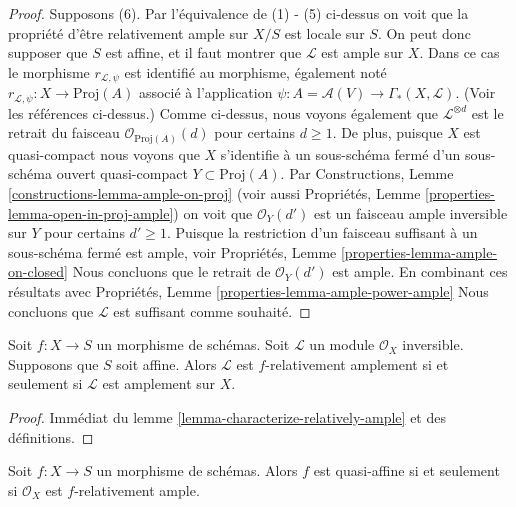 \begin{proof}
\medskip\noindent
Supposons (6). Par l'équivalence de (1) - (5) ci-dessus on
voit que la propriété d'être relativement ample sur $X/S$
est locale sur $S$. On peut donc supposer que
$S$ est affine, et il faut montrer que $\mathcal{L}$
est ample sur $X$. Dans ce cas le morphisme $r_{\mathcal{L}, \psi}$
est identifié au morphisme, également noté $r_{\mathcal{L}, \psi} : X \to \text{Proj}(A)$ associé
à l'application $\psi : A = \mathcal{A}(V) \to \Gamma_*(X, \mathcal{L})$. (Voir les références
ci-dessus.) Comme ci-dessus, nous voyons également
que $\mathcal{L}^{\otimes d}$ est le retrait du faisceau $\mathcal{O}_{\text{Proj}(A)}(d)$
pour certains $d \geq 1$. De plus, puisque
$X$ est quasi-compact nous
voyons que $X$ s'identifie à un sous-schéma fermé
d'un sous-schéma ouvert quasi-compact $Y \subset \text{Proj}(A)$.
Par
Constructions,
Lemme \ref{constructions-lemma-ample-on-proj} (voir aussi Propriétés,
Lemme
\ref{properties-lemma-open-in-proj-ample})
on voit que $\mathcal{O}_Y(d')$ est un faisceau
ample inversible sur $Y$ pour certains $d' \geq 1$.
Puisque la restriction d'un faisceau suffisant à un
sous-schéma fermé est ample, voir Propriétés,
Lemme
\ref{properties-lemma-ample-on-closed} Nous concluons que le
retrait de $\mathcal{O}_Y(d')$ est
ample. En combinant ces résultats avec Propriétés,
Lemme
\ref{properties-lemma-ample-power-ample} Nous concluons que $\mathcal{L}$
est suffisant comme souhaité.
\end{proof}

\begin{lemma}
\label{lemma-ample-over-affine}
\begin{reference}
\cite[II Corollaire 4.6.6]{EGA}
\end{reference}
Soit $f : X \to S$ un morphisme de schémas. Soit $\mathcal{L}$
un module $\mathcal{O}_X$ inversible. Supposons que $S$ soit
affine. Alors $\mathcal{L}$
est $f$-relativement amplement si et seulement si $\mathcal{L}$
est amplement sur $X$.
\end{lemma}

\begin{proof}
Immédiat du lemme \ref{lemma-characterize-relatively-ample} et des
définitions.
\end{proof}

\begin{lemma}
\label{lemma-quasi-affine-O-ample}
\begin{reference}
\cite[II Proposition 5.1.6]{EGA}
\end{reference}
Soit $f : X \to S$ un morphisme de schémas. Alors $f$ est quasi-affine si
et seulement si $\mathcal{O}_X$ est $f$-relativement ample.
\end{lemma}

